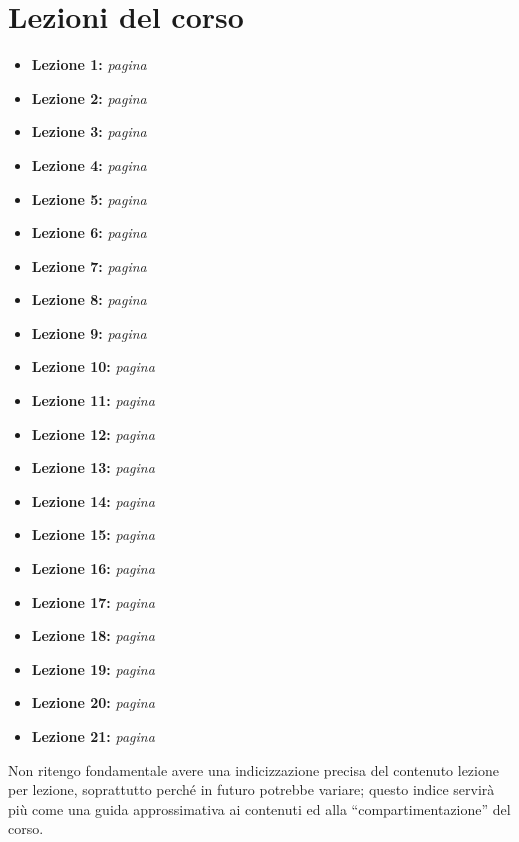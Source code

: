 \documentclass[a4paper,twoside]{book}
\begin{document}
	\section*{Lezioni del corso}
	\renewcommand{\labelitemi}{$\blacksquare$}
	\begin{itemize}
		\item {\large \textbf{Lezione 1:} \textit{pagina \pageref{lezione1}}}
		\item {\large \textbf{Lezione 2:} \textit{pagina \pageref{lezione2}}}
		\item {\large \textbf{Lezione 3:} \textit{pagina \pageref{lezione3}}}
		\item {\large \textbf{Lezione 4:} \textit{pagina \pageref{lezione4}}}
		\item {\large \textbf{Lezione 5:} \textit{pagina \pageref{lezione5}}}
		\item {\large \textbf{Lezione 6:} \textit{pagina \pageref{lezione6}}}
		\item {\large \textbf{Lezione 7:} \textit{pagina \pageref{lezione7}}}
		\item {\large \textbf{Lezione 8:} \textit{pagina \pageref{lezione8}}}
		\item {\large \textbf{Lezione 9:} \textit{pagina \pageref{lezione9}}}
		\item {\large \textbf{Lezione 10:} \textit{pagina \pageref{lezione10}}}
		\item {\large \textbf{Lezione 11:} \textit{pagina \pageref{lezione11}}}
		\item {\large \textbf{Lezione 12:} \textit{pagina \pageref{lezione12}}}
		\item {\large \textbf{Lezione 13:} \textit{pagina \pageref{lezione13}}}
		\item {\large \textbf{Lezione 14:} \textit{pagina \pageref{lezione14}}}
		\item {\large \textbf{Lezione 15:} \textit{pagina \pageref{lezione15}}}
		\item {\large \textbf{Lezione 16:} \textit{pagina \pageref{lezione16}}}
		\item {\large \textbf{Lezione 17:} \textit{pagina \pageref{lezione17}}}
		\item {\large \textbf{Lezione 18:} \textit{pagina \pageref{lezione18}}}
		\item {\large \textbf{Lezione 19:} \textit{pagina \pageref{lezione19}}}
		\item {\large \textbf{Lezione 20:} \textit{pagina \pageref{lezione20}}}
		\item {\large \textbf{Lezione 21:} \textit{pagina \pageref{lezione21}}}
	\end{itemize}
	\renewcommand{\labelitemi}{$\bullet$}
	Non ritengo fondamentale avere una indicizzazione precisa del contenuto lezione per lezione, soprattutto perché in futuro potrebbe variare; questo indice 	servirà più come una guida approssimativa ai contenuti ed alla \enquote{compartimentazione} del corso.
	
\end{document}
